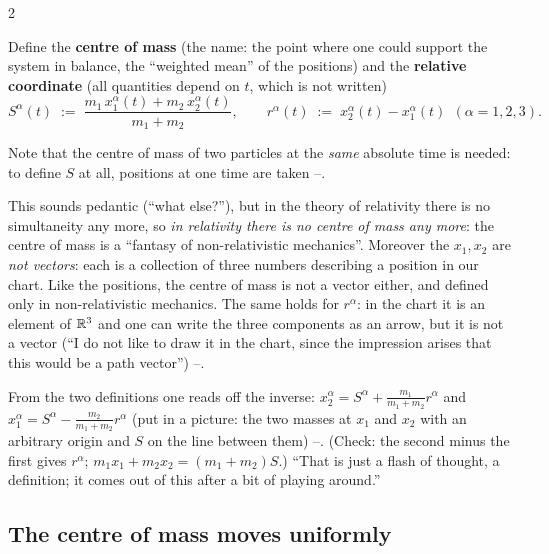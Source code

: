 \begin{paracol}{2}
\begin{definition}\label{def:tb-cm}
Define the \textbf{centre of mass} (the name: the point where one could support the system in balance, the ``weighted mean'' of the positions) and the \textbf{relative coordinate} (all quantities depend on $t$, which is not written)
\begin{equation}\label{eq:tb-cm}
  S^\alpha(t)\;:=\;\frac{m_1\,x_1^\alpha(t)+m_2\,x_2^\alpha(t)}{m_1+m_2},\qquad
  r^\alpha(t)\;:=\;x_2^\alpha(t)-x_1^\alpha(t)\ \ (\alpha=1,2,3).
\end{equation}
\end{definition}
Note that the centre of mass of two particles at the \emph{same} absolute time is needed: to define $S$ at all, positions at one time are taken --.

\begin{coursenote}\label{cn:tb-nocm}
This sounds pedantic (``what else?''), but in the theory of relativity there is no simultaneity any more, so \emph{in relativity there is no centre of mass any more}: the centre of mass is a ``fantasy of non-relativistic mechanics''. Moreover the $x_1,x_2$ are \emph{not vectors}: each is a collection of three numbers describing a position in our chart. Like the positions, the centre of mass is not a vector either, and defined only in non-relativistic mechanics. The same holds for $r^\alpha$: in the chart it is an element of $\mathbb{R}^3$ and one can write the three components as an arrow,
but it is not a vector (``I do not like to draw it in the chart, since the impression arises that this would be a path vector'') --.
\end{coursenote}

From the two definitions one reads off the inverse: $x_2^\alpha=S^\alpha+\frac{m_1}{m_1+m_2}r^\alpha$ and $x_1^\alpha=S^\alpha-\frac{m_2}{m_1+m_2}r^\alpha$ (put in a picture: the two masses at $x_1$ and $x_2$ with an arbitrary origin and $S$ on the line between them) --. (Check: the second minus the first gives $r^\alpha$; $m_1x_1+m_2x_2=(m_1+m_2)S$.) ``That is just a flash of thought, a definition; it comes out of this after a bit of playing around.''

\subsection{The centre of mass moves uniformly}\label{ssec:tb-cm}


\end{paracol}
